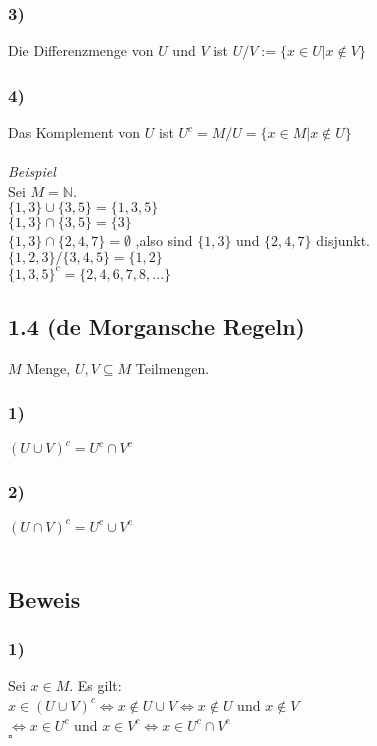 \documentclass[11pt, oneside, a4paper]{article}
\begin{document}
\subsubsection*{3)}
Die Differenzmenge von $U$ und $V$ ist $U \slash V := \{x \in U | x \not \in V\}$
\subsubsection*{4)}
Das Komplement von $U$ ist $U^c = M \slash U = \{x \in M | x \not \in U\}$ \\ \\
\textit{Beispiel} \\
Sei $M = \mathbb{N}$.\\
$\{1,3\} \cup \{3,5\} = \{1,3,5\}$ \\
$\{1,3\} \cap \{3,5\} = \{3\}$ \\
$\{1,3\} \cap \{2,4,7\} = \emptyset$ ,also sind $\{1,3\}$ und $\{2,4,7\}$ disjunkt. \\
$\{1,2,3\} \slash \{3,4,5\} = \{1,2\}$ \\
$\{1,3,5\}^c = \{2,4,6,7,8,...\}$
\subsection*{1.4 (de Morgansche Regeln)}
$M$ Menge, $U,V \subseteq M$ Teilmengen.
\subsubsection*{1)}
$(U \cup V)^c = U^c \cap V^c$
\subsubsection*{2)}
$(U \cap V)^c = U^c \cup V^c$ \\ \\
\subsection*{Beweis}
\subsubsection*{1)}
Sei $x \in M$. Es gilt: \\
$x \in (U \cup V)^c \Leftrightarrow x \not \in U \cup V \Leftrightarrow x \not \in U$ und $x \not \in V$ \\ 
$\Leftrightarrow x \in U^c $ und $x \in V^c \Leftrightarrow x \in U^c \cap V^c$ \\
\hphantom{spaces}\hphantom{spaces}\hphantom{spaces}\hphantom{spaces}\hphantom{spaces}\hphantom{spaces}\hphantom{spaces}$\square$
\end{document}
